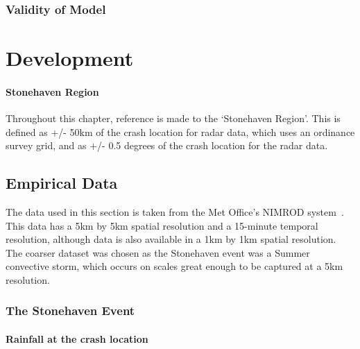 \documentclass[12pt,a4paper]{report}
\begin{document}
\subsection{Validity of Model}\label{subsec:modelvalid}

\chapter{Development}\label{ch:dev}

\subsubsection*{Stonehaven Region}

Throughout this chapter,
    reference is made to the `Stonehaven Region'.
This is defined as +/- 50km of the crash location for radar data,
    which uses an ordinance survey grid,
    and as +/- 0.5 degrees of the crash location for the radar data.

\section{Empirical Data}\label{sec:def}

The data used in this section is taken from the Met Office's NIMROD system~\cite{radar_data}.
This data has a 5km by 5km spatial resolution and a 15-minute temporal resolution,
    although data is also available in a 1km by 1km spatial resolution.
The coarser dataset was chosen as the Stonehaven event was a Summer convective storm,
    which occurs on scales great enough to be captured at a 5km resolution.

\subsection{The Stonehaven Event}\label{subsec:actualevent}

\subsubsection{Rainfall at the crash location}
\end{document}

